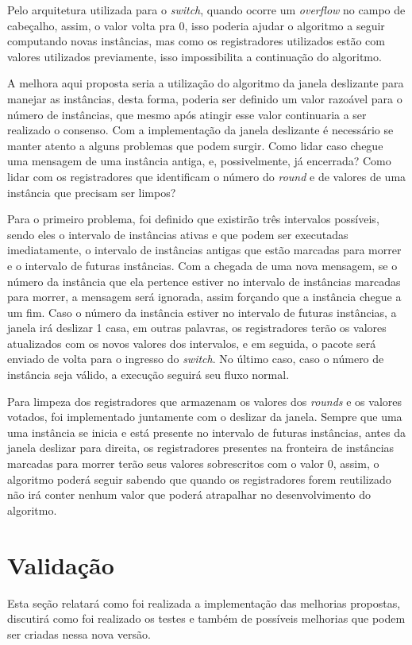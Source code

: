 \documentclass[
    12pt,
    openright, 
    oneside,
    a4paper,
    french,
    english,
    brazil
    ]{facom-ufu-abntex2}
\theoremstyle{definition}
\begin{document}
Pelo arquitetura utilizada para o \emph{switch}, quando ocorre um \emph{overflow} no campo de cabeçalho, assim,
o valor volta pra 0, isso poderia ajudar o algoritmo a seguir computando novas instâncias, mas como
os registradores utilizados estão com valores utilizados previamente, isso impossibilita a continuação
do algoritmo.

A melhora aqui proposta seria a utilização do algoritmo da janela deslizante para manejar as instâncias,
desta forma, poderia ser definido um valor razoável para o número de instâncias, que mesmo após atingir
esse valor continuaria a ser realizado o consenso. Com a implementação da janela deslizante é necessário
se manter atento a alguns problemas que podem surgir. Como lidar caso chegue uma mensagem
de uma instância antiga, e, possivelmente, já encerrada? Como lidar com os registradores que identificam
o número do \emph{round} e de valores de uma instância que precisam ser limpos?

Para o primeiro problema, foi definido que existirão três intervalos possíveis, sendo eles o intervalo
de instâncias ativas e que podem ser executadas imediatamente, o intervalo de instâncias antigas que
estão marcadas para morrer e o intervalo de futuras instâncias. Com a chegada de uma nova mensagem, se o 
número da instância que ela pertence estiver no intervalo de instâncias marcadas para morrer, a mensagem
será ignorada, assim forçando que a instância chegue a um fim. Caso o número da instância estiver no
intervalo de futuras instâncias, a janela irá deslizar 1 casa, em outras palavras, os registradores terão
os valores atualizados com os novos valores dos intervalos, e em seguida, o pacote será enviado de volta 
para o ingresso do \emph{switch}. No último caso, caso o número de instância seja válido,
a execução seguirá seu fluxo normal.

Para limpeza dos registradores que armazenam os valores dos \emph{rounds} e os valores votados, foi implementado
juntamente com o deslizar da janela. Sempre que uma uma instância se inicia e está presente no intervalo de
futuras instâncias, antes da janela deslizar para direita, os registradores presentes na fronteira de 
instâncias marcadas para morrer terão seus valores sobrescritos com o valor 0, assim, o algoritmo poderá
seguir sabendo que quando os registradores forem reutilizado não irá conter nenhum valor que poderá atrapalhar
no desenvolvimento do algoritmo.

\section{Validação}
Esta seção relatará como foi realizada a implementação das melhorias propostas, discutirá como foi realizado
os testes e também de possíveis melhorias que podem ser criadas nessa nova versão.
\end{document}
